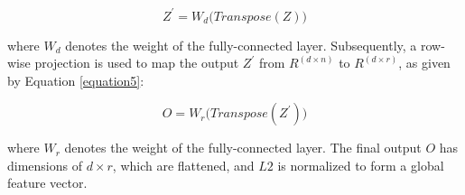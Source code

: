 \begin{equation}
\label{equation4}
    {Z^{'}}={W_d}{\big(}Transpose(Z){\big)}
\end{equation}

where $W_{d}$ denotes the weight of the fully-connected layer. Subsequently, a row-wise projection is used to map the output $Z^{'}$ from $R^{(d\times n)}$ to $R^{(d\times r)}$, as given by Equation \ref{equation5}:

\begin{equation}
\label{equation5}
   O={W_{r}}{\big(}Transpose({Z^{'}}){\big)}
\end{equation}

where $W_r$ denotes the weight of the fully-connected layer. The final output $O$ has dimensions of $d\times r$, which are flattened, and $L2$ is normalized to form a global feature vector.


